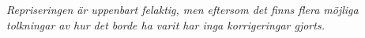 \vspace{5mm}
\textit{
Repriseringen är uppenbart felaktig, men eftersom det finns flera möjliga
tolkningar av hur det borde ha varit har inga korrigeringar gjorts.
}